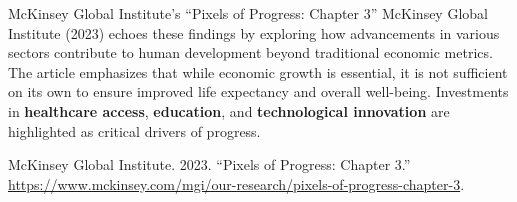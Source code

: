 \documentclass[
]{article}
\newlength{\cslhangindent}
\newenvironment{CSLReferences}[2] %
 {\begin{list}{}{%
  \setlength{\itemindent}{0pt}
  \setlength{\leftmargin}{0pt}
  \setlength{\parsep}{0pt}
  \ifodd #1
   \setlength{\leftmargin}{\cslhangindent}
   \setlength{\itemindent}{-1\cslhangindent}
  \fi
  \setlength{\itemsep}{#2\baselineskip}}}
 {\end{list}}
\begin{document}
McKinsey Global Institute's ``Pixels of Progress: Chapter 3'' McKinsey
Global Institute (2023) echoes these findings by exploring how
advancements in various sectors contribute to human development beyond
traditional economic metrics. The article emphasizes that while economic
growth is essential, it is not sufficient on its own to ensure improved
life expectancy and overall well-being. Investments in
\textbf{healthcare access}, \textbf{education}, and
\textbf{technological innovation} are highlighted as critical drivers of
progress.

\label{refs}
\begin{CSLReferences}{1}{0}
McKinsey Global Institute. 2023. {``Pixels of Progress: Chapter 3.''}
\url{https://www.mckinsey.com/mgi/our-research/pixels-of-progress-chapter-3}.

\end{CSLReferences}
\end{document}
